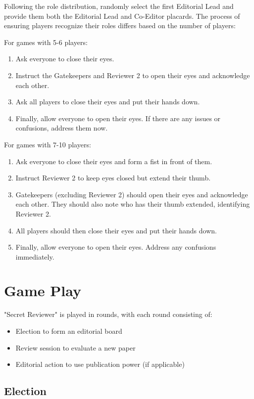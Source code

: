 \documentclass[sigplan,screen,nonacm]{acmart}
\begin{document}
Following the role distribution, randomly select the first Editorial Lead and provide them both the Editorial Lead and Co-Editor placards. The process of ensuring players recognize their roles differs based on the number of players:

For games with 5-6 players:
\begin{enumerate}
	\item Ask everyone to close their eyes.
	\item Instruct the Gatekeepers and Reviewer 2 to open their eyes and acknowledge each other.
	\item Ask all players to close their eyes and put their hands down.
	\item Finally, allow everyone to open their eyes. If there are any issues or confusions, address them now.
\end{enumerate}

For games with 7-10 players:
\begin{enumerate}
	\item Ask everyone to close their eyes and form a fist in front of them.
	\item Instruct Reviewer 2 to keep eyes closed but extend their thumb.
	\item Gatekeepers (excluding Reviewer 2) should open their eyes and acknowledge each other. They should also note who has their thumb extended, identifying Reviewer 2.
	\item All players should then close their eyes and put their hands down.
	\item Finally, allow everyone to open their eyes. Address any confusions immediately.
\end{enumerate}

\section{Game Play}
"Secret Reviewer" is played in rounds, with each round consisting of:
\begin{itemize}
	\item Election to form an editorial board
	\item Review session to evaluate a new paper
	\item Editorial action to use publication power (if applicable)
\end{itemize}

\subsection{Election}
\end{document}
